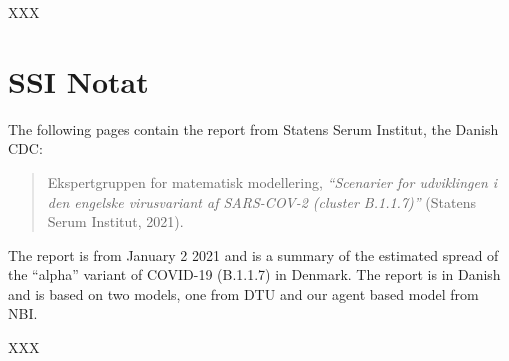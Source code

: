 \clearpage
% 
% 
XXX



\chapter{SSI Notat}
\label{appendix:ssi-notat}

The following pages contain the report from Statens Serum Institut, the Danish CDC:
\begin{quote}
    Ekspertgruppen for matematisk modellering, \emph{``Scenarier for udviklingen i den engelske virusvariant af SARS-COV-2 (cluster B.1.1.7)''} (Statens Serum Institut, 2021).
\end{quote}
The report is from January 2 2021 and is a summary of the estimated spread of the ``alpha'' variant of COVID-19 (B.1.1.7) in Denmark. The report is in Danish and is based on two models, one from DTU and our agent based model from NBI.

\clearpage
% 
XXX


